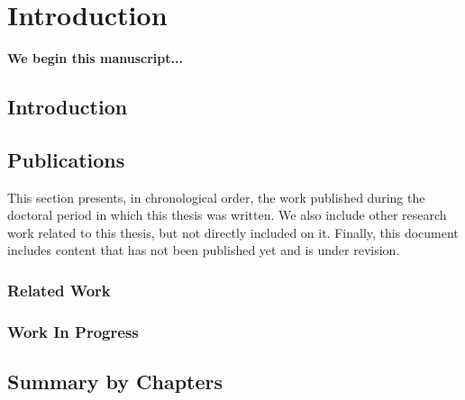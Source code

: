 
\chapter{Introduction} %
\label{Chapter1}

{\bf \small{
We begin this manuscript...
}}


\section{Introduction}

\section{Publications}

This section presents, in chronological order, the work published during the doctoral period in which this thesis was written. We also include other research work related to this thesis, but not directly included on it. Finally, this document includes content that has not been published yet and is under revision.



\subsection*{Related Work}



\subsection*{Work In Progress}


\section{Summary by Chapters}\label{sumchap}

